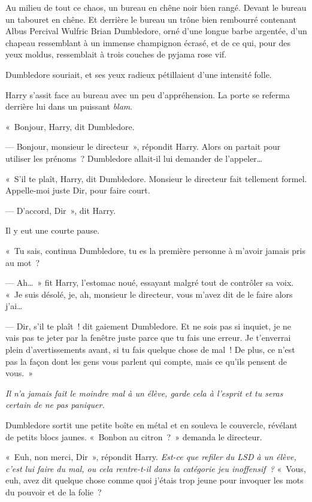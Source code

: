 Au milieu de tout ce chaos, un bureau en chêne noir bien rangé.
Devant le bureau un tabouret en chêne.
Et derrière le bureau un trône bien rembourré contenant Albus Percival Wulfric Brian Dumbledore, orné d'une longue barbe argentée, d'un chapeau ressemblant à un immense champignon écrasé, et de ce qui, pour des yeux moldus, ressemblait à trois couches de pyjama rose vif.

Dumbledore souriait, et ses yeux radieux pétillaient d'une intensité folle.

Harry s'assit face au bureau avec un peu d'appréhension.
La porte se referma derrière lui dans un puissant \emph{blam}.

«~Bonjour, Harry, dit Dumbledore.

--- Bonjour, monsieur le directeur~», répondit Harry.
Alors on partait pour utiliser les prénoms~?
Dumbledore allait-il lui demander de l'appeler…

«~S'il te plaît, Harry, dit Dumbledore.
Monsieur le directeur fait tellement formel.
Appelle-moi juste Dir, pour faire court.

--- D'accord, Dir~», dit Harry.

Il y eut une courte pause.

«~Tu sais, continua Dumbledore, tu es la première personne à m'avoir jamais pris au mot~?

--- Ah…~» fit Harry, l'estomac noué, essayant malgré tout de contrôler sa voix.
«~Je suis désolé, je, ah, monsieur le directeur, vous m'avez dit de le faire alors j'ai…

--- Dir, s'il te plaît~! dit gaiement Dumbledore.
Et ne sois pas si inquiet, je ne vais pas te jeter par la fenêtre juste parce que tu fais une erreur.
Je t'enverrai plein d'avertissements avant, si tu fais quelque chose de mal~!
De plus, ce n'est pas la façon dont les gens vous parlent qui compte, mais ce qu'ils pensent de vous.~»

\emph{Il n'a jamais fait le moindre mal à un élève, garde cela à l'esprit et tu seras certain de ne pas paniquer.}

Dumbledore sortit une petite boîte en métal et en souleva le couvercle, révélant de petits blocs jaunes.
«~Bonbon au citron~?~»
demanda le directeur.

«~Euh, non merci, Dir~», répondit Harry.
\emph{Est-ce que refiler du LSD à un élève, c'est lui faire du mal, ou cela rentre-t-il dans la catégorie jeu inoffensif~?}
«~Vous, euh, avez dit quelque chose comme quoi j'étais trop jeune pour invoquer les mots du pouvoir et de la folie~?

